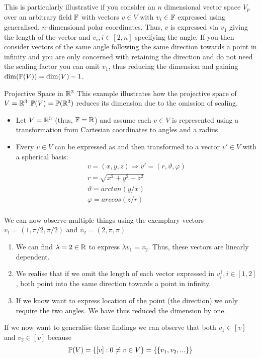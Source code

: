 This is particularly illustrative if you consider an $n$ dimensional vector space $V_p$ over an arbitrary field $\mathbb{F}$ with vectors $v\in V$ with $v_i \in \mathbb{F}$ expressed using generalised, $n$-dimensional polar coordinates. Thus, $v$ is expressed via $v_1$ giving the length of the vector and $v_i, i \in [2,n]$ specifying the angle. If you then consider vectors of the same angle following the same direction towards a point in infinity and you are only concerned with retaining the direction and do not need the scaling factor you can omit $v_1$, thus reducing the dimension and gaining $\mathrm{dim}(\mathbb{P}(V)) = \mathrm{dim}(V) - 1$. 


\begin{exampleBox}{Projective Space in $\mathbb{R}^3$}
    This example illustrates how the projective space of $V = \mathbb{R}^3$ $\mathbb{P}(V) = \mathbb{P}(\mathbb{R}^3)$ reduces its dimension due to the omission of scaling.
    \begin{itemize}
        \item Let $V = \mathbb{R}^3$ (thus, $\mathbb{F} = \mathbb{R}$) and assume each $v \in V$ is represented using a transformation from Cartesian coordinates to angles and a radius.
        \item Every $v \in V$ can be expressed as and then transformed to a vector $v' \in V$ with a spherical basis: 
            \begin{gather*}
                v = (x,y,z) \Rightarrow v' =  (r, \vartheta,\varphi)  \\
                r = \sqrt{x^2+y^2+z^2} \\
                \vartheta = arctan(y/x) \\
                \varphi = arccos(z/r) \\   
            \end{gather*}
    \end{itemize}  
    
    We can now observe multiple things using the exemplary vectors $v_1 = (1, \pi/2,\pi/2)$ and $v_2 = (2, \pi,\pi)$
    \begin{enumerate}
        \item We can find $\lambda = 2 \in \mathbb{R}$ to express $\lambda v_1 = v_2$. Thus, these vectors are linearly dependent.
        \item We realise that if we omit the length of each vector expressed in $v_i^1, i \in [1,2]$, both point into the same direction towards a point in infinity.
        \item If we know want to express location of the point (the direction) we only require the two angles. We have thus reduced the dimension by one.
    \end{enumerate}
    If we now want to generalise these findings we can observe that both $v_1 \in [v]$ and $v_2 \in [v]$ because
    \begin{gather*}
        \mathbb{P}(V) = \{ [v] :  0 \neq v\in V\} = \{ \{v_1, v_2, ...\}\} 
    \end{gather*}
    
\end{exampleBox}